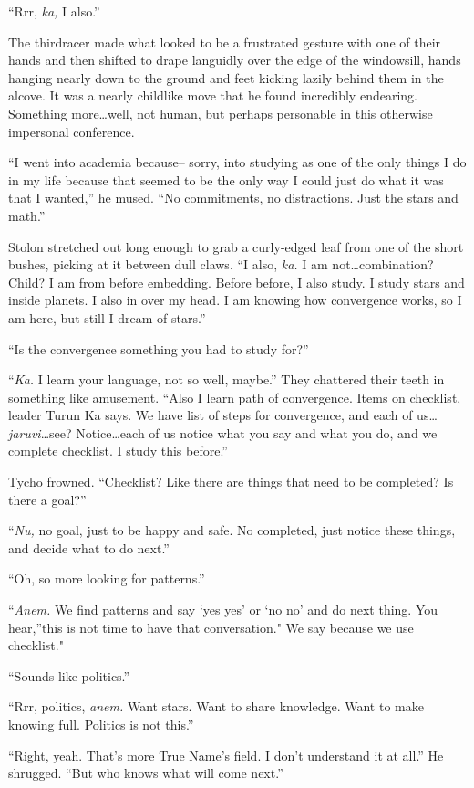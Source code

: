 ``Rrr, \emph{ka,} I also.''

The thirdracer made what looked to be a frustrated gesture with one of their hands and then shifted to drape languidly over the edge of the windowsill, hands hanging nearly down to the ground and feet kicking lazily behind them in the alcove. It was a nearly childlike move that he found incredibly endearing. Something more\ldots well, not human, but perhaps personable in this otherwise impersonal conference.

``I went into academia because-- sorry, into studying as one of the only things I do in my life because that seemed to be the only way I could just do what it was that I wanted,'' he mused. ``No commitments, no distractions. Just the stars and math.''

Stolon stretched out long enough to grab a curly-edged leaf from one of the short bushes, picking at it between dull claws. ``I also, \emph{ka.} I am not\ldots combination? Child? I am from before embedding. Before before, I also study. I study stars and inside planets. I also in over my head. I am knowing how convergence works, so I am here, but still I dream of stars.''

``Is the convergence something you had to study for?''

``\emph{Ka.} I learn your language, not so well, maybe.'' They chattered their teeth in something like amusement. ``Also I learn path of convergence. Items on checklist, leader Turun Ka says. We have list of steps for convergence, and each of us\ldots{}\emph{jaruvi}\ldots see? Notice\ldots each of us notice what you say and what you do, and we complete checklist. I study this before.''

Tycho frowned. ``Checklist? Like there are things that need to be completed? Is there a goal?''

``\emph{Nu,} no goal, just to be happy and safe. No completed, just notice these things, and decide what to do next.''

``Oh, so more looking for patterns.''

``\emph{Anem.} We find patterns and say `yes yes' or `no no' and do next thing. You hear,''this is not time to have that conversation." We say because we use checklist."

``Sounds like politics.''

``Rrr, politics, \emph{anem.} Want stars. Want to share knowledge. Want to make knowing full. Politics is not this.''

``Right, yeah. That's more True Name's field. I don't understand it at all.'' He shrugged. ``But who knows what will come next.''

